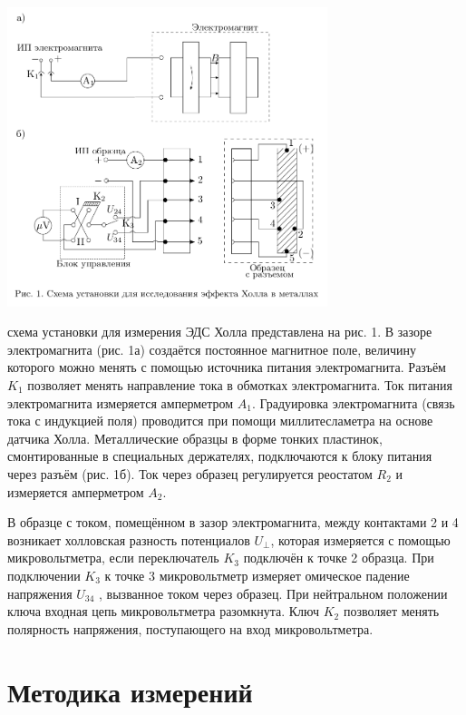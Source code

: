 \documentclass[15pt,a5paper,reqno]{article}
\begin{document}
    \begin{center}
        \includegraphics[width=0.7\textwidth]{images/picture_1.png}
    \end{center}
     схема установки для измерения ЭДС Холла представлена на рис. 1. В зазоре электромагнита (рис. 1а) создаётся постоянное магнитное поле, величину которого можно менять с помощью источника питания электромагнита. Разъём $K_1$ позволяет менять направление тока в обмотках электромагнита. Ток питания электромагнита измеряется амперметром $A_1$. Градуировка электромагнита (связь тока с индукцией поля) проводится при помощи миллитесламетра на основе датчика Холла. Металлические образцы в форме тонких пластинок, смонтированные в специальных держателях, подключаются к блоку питания через разъём (рис. 1б). Ток через образец регулируется реостатом $R_2$ и измеряется амперметром $A_2$.
    
    В образце с током, помещённом в зазор электромагнита, между контактами 2 и 4 возникает холловская разность потенциалов $U_{\perp}$, которая измеряется с помощью микровольтметра, если переключатель $K_3$ подключён к точке 2 образца. При подключении $K_3$ к точке 3 микровольтметр измеряет омическое падение напряжения $U_{34}$ , вызванное током через образец. При нейтральном положении ключа входная цепь микровольтметра разомкнута. Ключ $K_2$ позволяет менять полярность напряжения, поступающего на вход микровольтметра.

    \section{Методика измерений}
    
\end{document}
